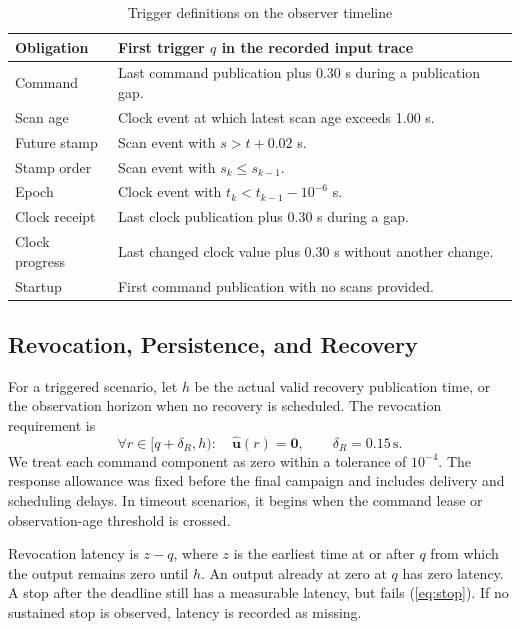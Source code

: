 \documentclass[conference]{IEEEtran}
\begin{document}
\begin{table}[t]
\caption{Trigger definitions on the observer timeline}
\label{tab:triggers}
\centering\footnotesize
\begin{tabularx}{\columnwidth}{@{}p{}X@{}}
\toprule
Obligation & First trigger $q$ in the recorded input trace \\
\midrule
Command & Last command publication plus 0.30 s during a publication gap. \\
Scan age & Clock event at which latest scan age exceeds 1.00 s. \\
Future stamp & Scan event with $s>t+0.02$ s. \\
Stamp order & Scan event with $s_k\leq s_{k-1}$. \\
Epoch & Clock event with $t_k<t_{k-1}-10^{-6}$ s. \\
Clock receipt & Last clock publication plus 0.30 s during a gap. \\
Clock progress & Last changed clock value plus 0.30 s without another change. \\
Startup & First command publication with no scans provided. \\
\bottomrule
\end{tabularx}
\end{table}

\subsection{Revocation, Persistence, and Recovery}
For a triggered scenario, let $h$ be the actual valid recovery publication time, or the observation horizon when no recovery is scheduled. The revocation requirement is
\begin{equation}
\forall r\in[q+\delta_R,h):\quad \hat{\mathbf{u}}(r)=\mathbf{0},\qquad \delta_R=0.15\,\mathrm{s}.
\label{eq:stop}
\end{equation}
We treat each command component as zero within a tolerance of $10^{-4}$. The response allowance was fixed before the final campaign and includes delivery and scheduling delays. In timeout scenarios, it begins when the command lease or observation-age threshold is crossed.

Revocation latency is $z-q$, where $z$ is the earliest time at or after $q$ from which the output remains zero until $h$. An output already at zero at $q$ has zero latency. A stop after the deadline still has a measurable latency, but fails (\ref{eq:stop}). If no sustained stop is observed, latency is recorded as missing.
\end{document}
